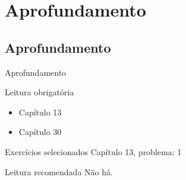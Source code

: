 \documentclass{beamer}
\begin{document}
\section{Aprofundamento}

\subsection{Aprofundamento}

\begin{frame}{Aprofundamento}
  \begin{block}{Leitura obrigatória}
    \begin{itemize}
    \item Capítulo 13
    \item Capítulo 30
    \end{itemize}
  \end{block}
  \begin{block}{Exercícios selecionados}
    \small
    Capítulo 13, problema: 1
  \end{block}
  \begin{block}{Leitura recomendada}
    \small
    Não há.
  \end{block}
\end{frame}
\end{document}
